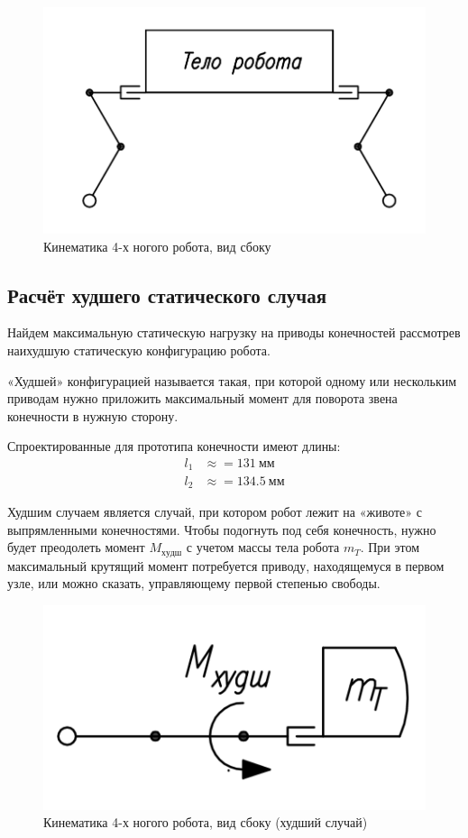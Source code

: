\begin{figure}[ht]
    \centering
    \includegraphics[scale=0.7]{kin1.png}
    \caption{Кинематика 4-х ногого робота, вид сбоку}
    \label{fig:kin_scheme1}
\end{figure}


\subsection{Расчёт худшего статического случая}

Найдем максимальную статическую нагрузку на приводы конечностей рассмотрев наихудшую статическую конфигурацию робота.

«Худшей» конфигурацией называется такая, при которой одному или нескольким приводам нужно приложить максимальный момент для поворота звена конечности в нужную сторону.

Спроектированные для прототипа конечности имеют длины:
\begin{align*}
    l_1 &\approx = 131\: мм \\
    l_2 &\approx = 134.5\: мм
\end{align*}

Худшим случаем является случай, при котором робот лежит на «животе» с выпрямленными конечностями. Чтобы подогнуть под себя конечность, нужно будет преодолеть момент $M_{худш}$ с учетом массы тела робота $m_T$. При этом максимальный крутящий момент потребуется приводу, находящемуся в первом узле, или можно сказать, управляющему первой степенью свободы.

\begin{figure}[ht]
    \centering
    \includegraphics[scale=1]{kin2.png}
    \caption{Кинематика 4-х ногого робота, вид сбоку (худший случай)}
\end{figure}

